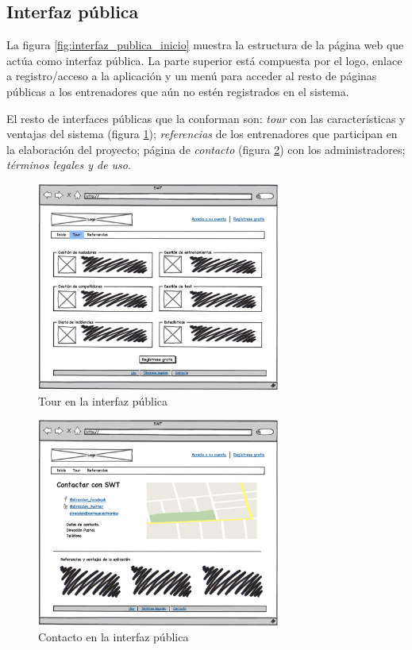 	\subsection{Interfaz pública} %
		\label{sub:interfaz_publica}
		
		La figura \ref{fig:interfaz_publica_inicio} muestra la estructura de la página web que actúa como interfaz pública. La parte superior está compuesta por el logo, enlace a registro/acceso a la aplicación y un menú para acceder al resto de páginas públicas a los entrenadores que aún no estén registrados en el sistema.
			
		El resto de interfaces públicas que la conforman son: {\it tour} con las características y ventajas del sistema (figura \ref{fig:interfaz_publica_tour}); {\it referencias} de los entrenadores que participan en la elaboración del proyecto; página de {\it contacto} (figura \ref{fig:interfaz_publica_contacto}) con los administradores; {\it términos legales y de uso}. 
		
		\begin{figure}[H]
		  \centering
		    \includegraphics[width=8cm]{./eps/p_interfaz/2_Tour.eps}
		  \caption{Tour en la interfaz pública}
		  \label{fig:interfaz_publica_tour}
		\end{figure}

		\begin{figure}[H]
		  \centering
		    \includegraphics[width=8cm]{./eps/p_interfaz/3_Contacto.eps}
		  \caption{Contacto en la interfaz pública}
		  \label{fig:interfaz_publica_contacto}
		\end{figure}

